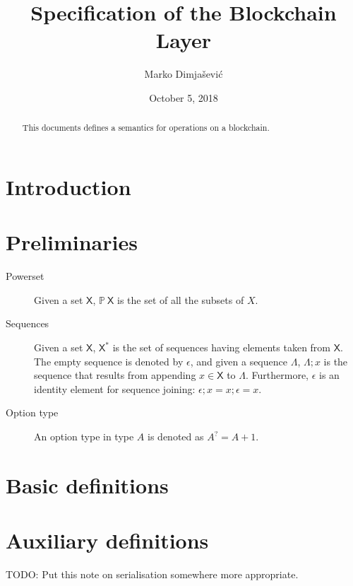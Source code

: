 \documentclass[11pt,a4paper]{article}
\newcommand{\powerset}[1]{\mathbb{P}~#1}
\newcommand{\type}[1]{\mathsf{#1}}
\newcommand{\seqof}[1]{#1^{*}}
\begin{document}
\title{Specification of the Blockchain Layer}

\author{Marko Dimjašević}

\date{October 5, 2018}

\maketitle

\begin{abstract}
This documents defines a semantics for operations on a blockchain.
\end{abstract}

\tableofcontents
\listoffigures

\section{Introduction}
\label{sec:introduction}

\section{Preliminaries}
\label{sec:preliminaries}

\begin{description}
\item[Powerset] Given a set $\type{X}$, $\powerset{\type{X}}$ is the set of all
  the subsets of $X$.
\item[Sequences] Given a set $\type{X}$, $\seqof{\type{X}}$ is the set of
  sequences having elements taken from $\type{X}$.
  The empty sequence is denoted by $\epsilon$, and given a sequence $\Lambda$,
  $\Lambda; x$ is the sequence that results from appending
  $x \in \type{X}$ to $\Lambda$.
  Furthermore, $\epsilon$ is an identity element for sequence joining:
  $\epsilon; x = x; \epsilon = x$.
\item[Option type] An option type in type $A$ is denoted as $A^? = A + 1$.
\end{description}

\section{Basic definitions}
\label{sec:basic-definitions}

\section{Auxiliary definitions}
\label{sec:auxil-defin}
TODO: Put this note on serialisation somewhere more appropriate.
\end{document}
